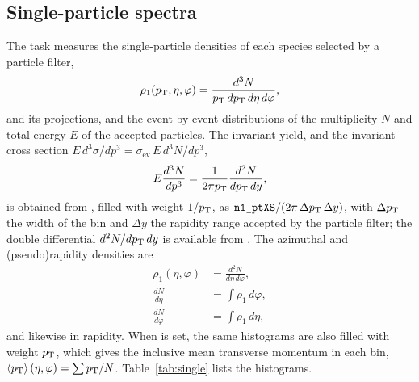 \subsection{Single-particle spectra}
\label{sec:single}

The task  measures the single-particle densities of each species selected by a particle
filter,
\begin{equation}
  \rho_1(p_{\mathrm{T}},\eta,\varphi) = \frac{d^3N}{p_{\mathrm{T}}\,dp_{\mathrm{T}}\,d\eta\,d\varphi},
\end{equation}
and its projections, and the event-by-event distributions of the multiplicity $N$ and total energy $E$ of the accepted
particles. The invariant yield, and the invariant cross section $E\,d^3\sigma/dp^3 = \sigma_{\mathrm{ev}}\,E\,d^3N/dp^3$,
\begin{equation}
  E\frac{d^3N}{dp^3} = \frac{1}{2\pi p_{\mathrm{T}}}\frac{d^2N}{dp_{\mathrm{T}}\,dy},
  \label{eq:invariant}
\end{equation}
is obtained from , filled with weight $1/p_{\mathrm{T}}$, as $\texttt{n1\_ptXS}/(2\pi\,\Delta p_{\mathrm{T}}\,\Delta y)$, with
$\Delta p_{\mathrm{T}}$ the width of the bin and $\Delta y$ the rapidity range accepted by the particle filter; the double
differential $d^2N/dp_{\mathrm{T}}\,dy$ is available from . The azimuthal and (pseudo)rapidity densities are
\begin{align}
  \rho_1(\eta,\varphi) &= \frac{d^2N}{d\eta\,d\varphi}, \\ 
  \frac{dN}{d\eta} &= \int\! \rho_1\, d\varphi,  \\ 
  \frac{dN}{d\varphi} &= \int\! \rho_1\, d\eta ,
\end{align}
and likewise in rapidity. When  is set, the same histograms are also filled with weight $p_{\mathrm{T}}$, which
gives the inclusive mean transverse momentum in each bin, $\left\langle p_{\mathrm{T}} \right\rangle(\eta,\varphi) = \sum p_{\mathrm{T}}/N$. Table~\ref{tab:single}
lists the histograms.

